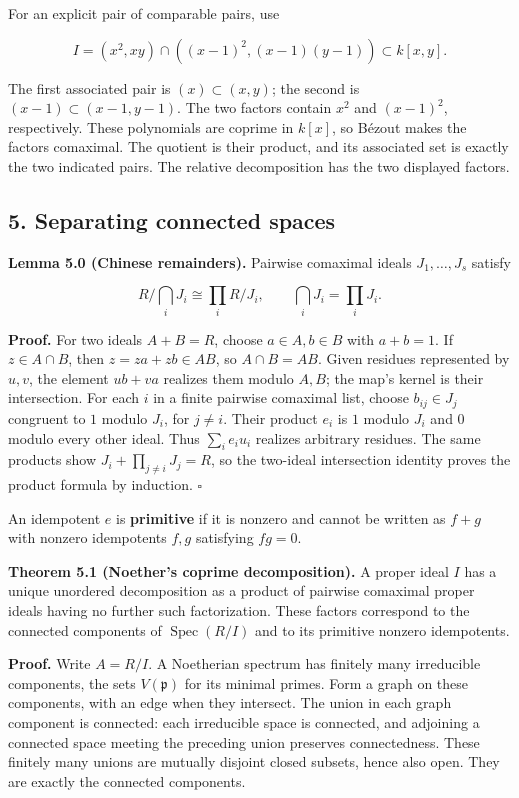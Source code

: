 \documentclass[
]{article}
\begin{document}
For an explicit pair of comparable pairs, use

\[
I=(x^2,xy)\cap((x-1)^2,(x-1)(y-1))\subset k[x,y].
\]

The first associated pair is \((x)\subset(x,y)\); the second is
\((x-1)\subset(x-1,y-1)\). The two factors contain \(x^2\) and
\((x-1)^2\), respectively. These polynomials are coprime in \(k[x]\), so
Bézout makes the factors comaximal. The quotient is their product, and
its associated set is exactly the two indicated pairs. The relative
decomposition has the two displayed factors.

\subsection{5. Separating connected
spaces}\label{separating-connected-spaces}

\textbf{Lemma 5.0 (Chinese remainders).} Pairwise comaximal ideals
\(J_1,\ldots,J_s\) satisfy

\[
R/\bigcap_iJ_i\cong\prod_iR/J_i,
\qquad \bigcap_iJ_i=\prod_iJ_i.
\]

\textbf{Proof.} For two ideals \(A+B=R\), choose \(a\in A,b\in B\) with
\(a+b=1\). If \(z\in A\cap B\), then \(z=za+zb\in AB\), so
\(A\cap B=AB\). Given residues represented by \(u,v\), the element
\(ub+va\) realizes them modulo \(A,B\); the map's kernel is their
intersection. For each \(i\) in a finite pairwise comaximal list, choose
\(b_{ij}\in J_j\) congruent to \(1\) modulo \(J_i\), for \(j\ne i\).
Their product \(e_i\) is \(1\) modulo \(J_i\) and \(0\) modulo every
other ideal. Thus \(\sum_i e_i u_i\) realizes arbitrary residues. The
same products show \(J_i+\prod_{j\ne i}J_j=R\), so the two-ideal
intersection identity proves the product formula by induction.
\(\square\)

An idempotent \(e\) is \textbf{primitive} if it is nonzero and cannot be
written as \(f+g\) with nonzero idempotents \(f,g\) satisfying \(fg=0\).

\textbf{Theorem 5.1 (Noether's coprime decomposition).} A proper ideal
\(I\) has a unique unordered decomposition as a product of pairwise
comaximal proper ideals having no further such factorization. These
factors correspond to the connected components of
\(\operatorname{Spec}(R/I)\) and to its primitive nonzero idempotents.

\textbf{Proof.} Write \(A=R/I\). A Noetherian spectrum has finitely many
irreducible components, the sets \(V(\mathfrak p)\) for its minimal
primes. Form a graph on these components, with an edge when they
intersect. The union in each graph component is connected: each
irreducible space is connected, and adjoining a connected space meeting
the preceding union preserves connectedness. These finitely many unions
are mutually disjoint closed subsets, hence also open. They are exactly
the connected components.
\end{document}
